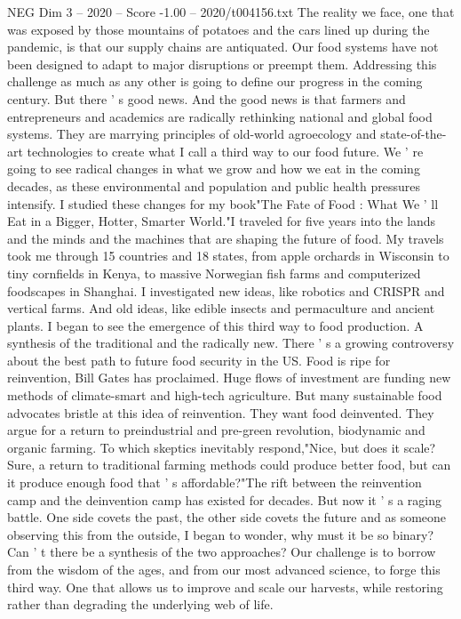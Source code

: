 \begin{textsample}{NEG Dim 3 – 2020 – Score -1.00 – 2020/t004156.txt}
The reality we face, one that was exposed by those mountains of potatoes and the cars lined up during the pandemic, is that our supply chains are antiquated.
Our food systems have not been designed to adapt to major disruptions or preempt them.
Addressing this challenge as much as any other is going to define our progress in the coming century.
But there ' s good news.
And the good news is that farmers and entrepreneurs and academics are radically rethinking national and global food systems.
They are marrying principles of old-world agroecology and state-of-the-art technologies to create what I call a third way to our food future.
We ' re going to see radical changes in what we grow and how we eat in the coming decades, as these environmental and population and public health pressures intensify.
I studied these changes for my book"The Fate of Food : What We ' ll Eat in a Bigger, Hotter, Smarter World."I traveled for five years into the lands and the minds and the machines that are shaping the future of food.
My travels took me through 15 countries and 18 states, from apple orchards in Wisconsin to tiny cornfields in Kenya, to massive Norwegian fish farms and computerized foodscapes in Shanghai.
I investigated new ideas, like robotics and CRISPR and vertical farms.
And old ideas, like edible insects and permaculture and ancient plants.
I began to see the emergence of this third way to food production.
A synthesis of the traditional and the radically new.
There ' s a growing controversy about the best path to future food security in the US.
Food is ripe for reinvention, Bill Gates has proclaimed.
Huge flows of investment are funding new methods of climate-smart and high-tech agriculture.
But many sustainable food advocates bristle at this idea of reinvention.
They want food deinvented.
They argue for a return to preindustrial and pre-green revolution, biodynamic and organic farming.
To which skeptics inevitably respond,"Nice, but does it scale?
Sure, a return to traditional farming methods could produce better food, but can it produce enough food that ' s affordable?"The rift between the reinvention camp and the deinvention camp has existed for decades.
But now it ' s a raging battle.
One side covets the past, the other side covets the future and as someone observing this from the outside, I began to wonder, why must it be so binary?
Can ' t there be a synthesis of the two approaches?
Our challenge is to borrow from the wisdom of the ages, and from our most advanced science, to forge this third way.
One that allows us to improve and scale our harvests, while restoring rather than degrading the underlying web of life.

\end{textsample}
